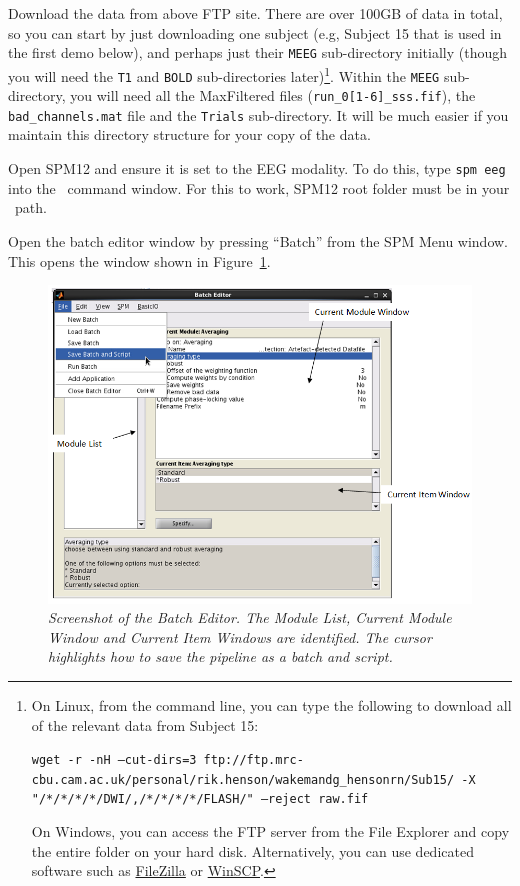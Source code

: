 Download the data from above FTP site. There are over 100GB of data in total, so you can start by just downloading one subject (e.g, Subject 15 that is used in the first demo below), and perhaps just their \texttt{MEEG} sub-directory initially (though you will need the \texttt{T1} and \texttt{BOLD} sub-directories later)\footnote{
On Linux, from the command line, you can type the following to download all of the relevant data from Subject 15:

\texttt{wget -r -nH --cut-dirs=3 ftp://ftp.mrc-cbu.cam.ac.uk/personal/rik.henson/wakemandg\_hensonrn/Sub15/ -X "/*/*/*/*/DWI/,/*/*/*/*/FLASH/" --reject raw.fif}

On Windows, you can access the FTP server from the File Explorer and copy the entire folder on your hard disk. Alternatively, you can use dedicated software such as \href{https://filezilla-project.org/}{FileZilla} or \href{http://winscp.net/}{WinSCP}.
}.
Within the \texttt{MEEG} sub-directory, you will need all the MaxFiltered files (\texttt{run\_0[1-6]\_sss.fif}), the \texttt{bad\_channels.mat} file and the \texttt{Trials} sub-directory. It will be much easier if you maintain this directory structure for your copy of the data.

Open SPM12 and ensure it is set to the EEG modality. To do this, type \texttt{spm eeg} into the \matlab\ command window. For this to work, SPM12 root folder must be in your \matlab\ path.

Open the batch editor window by pressing ``Batch'' from the SPM Menu window. This opens the window shown in Figure~\ref{multi:fig:1}. 

\begin{figure}
\begin{center}
\includegraphics[width=120mm]{multi/figures/figure1}
\caption{\em Screenshot of the Batch Editor. The Module List, Current Module Window and Current Item Windows are identified. The cursor highlights how to save the pipeline as a batch and script. \label{multi:fig:1}}
\end{center}
\end{figure}

